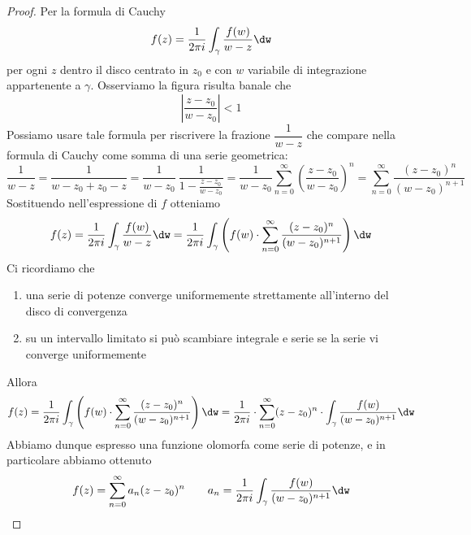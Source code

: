 \begin{proof}
Per la formula di Cauchy
\begin{equation*}
f(z) = \frac{1}{2\pi i}\int_{\gamma}\frac{f(w)}{w - z} \dw
\end{equation*}
per ogni $z$ dentro il disco centrato in $z_0$ e con $w$ variabile di integrazione appartenente a $\gamma.$
Osserviamo la figura risulta banale che
\begin{equation*}
\left| \frac{z - z_{0}}{w - z_{0}}\right| < 1
\end{equation*}
Possiamo usare tale formula per riscrivere la frazione $\dfrac{1}{w-z}$ che compare nella formula di Cauchy come somma di una serie geometrica:
$$
\frac{1}{w-z}=\frac{1}{w-z_0+z_0-z}=\frac{1}{w-z_0}\ \frac{1}{1-\frac{z-z_0}{w-z_0}}=\frac{1}{w-z_0}\sum_{n=0}^{\infty}\left(\frac{z-z_0}{w-z_0}\right)^n=\sum_{n=0}^{\infty}\frac{(z-z_0)^n}{(w-z_0)^{n+1}}
$$
Sostituendo nell'espressione di $f$ otteniamo
$$
f(z)=\frac{1}{2\pi i}\int_{\gamma}\frac{f(w)}{w-z}\dw=\frac{1}{2\pi i}\int_{\gamma}\left(f(w)\cdot \sum_{n=0}^{\infty}\frac{(z-z_0)^n}{(w-z_0)^{n+1}} \right)  \dw
$$
Ci ricordiamo che 
\begin{enumerate}
    \item una serie di potenze converge uniformemente strettamente all'interno del disco di convergenza
    \item su un intervallo limitato si può scambiare integrale e serie se la serie vi converge uniformemente
\end{enumerate}
Allora
$$
f(z)=\frac{1}{2\pi i}\int_{\gamma}\left(f(w)\cdot \sum_{n=0}^{\infty}\frac{(z-z_0)^n}{(w-z_0)^{n+1}} \right)  \dw=\frac{1}{2\pi i}\cdot \sum_{n=0}^\infty (z-z_0)^n \cdot \int_\gamma \frac{f(w)}{(w-z_0)^{n+1}}\dw
$$
Abbiamo dunque espresso una funzione olomorfa come serie di potenze, e in particolare abbiamo ottenuto
$$
f(z)=\sum_{n=0}^\infty a_n(z-z_0)^n \qquad a_n=\frac{1}{2\pi i}\int_{\gamma}\frac{f(w)}{(w-z_0)^{n+1}}\dw
$$
\end{proof}

\newpage


